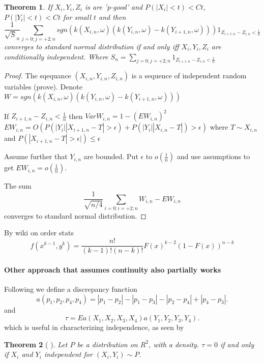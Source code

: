 \documentclass{article}
\newtheorem{Theorem}{Theorem}
\begin{document}
\begin{Theorem}
If $X_i,Y_i,Z_i$ is are 'p-good' and $P(|X_i| <t) <Ct$,  $P( |Y_i| <t) <Ct$ for small $t$ and then
\[
 \frac{1}{\sqrt S_n} \sum_{j=0;j=+2;n}  sgn(k(X_{i,n}, \omega) ( k(Y_{i,n}, \omega) - k(Y_{i+1,n}, \omega))) 1_{Z_{i+1,n} - Z_{i,n} < \frac 1 n }  
\]
converges to standard normal distribution  if and only iff  $X_i,Y_i,Z_i$ are conditionally independent. Where $S_n = \sum_{j=0;j=+2;n} 1_{Z_{i+1,n} - Z_{i,n} < \frac 1 n }$
\end{Theorem}
\begin{proof}
The sqequance $(X_{i,n},Y_{i,n},Z_{i,n})$ is a sequence of independent random variables (prove). Denote 
$W  = sgn(k(X_{i,n}, \omega) ( k(Y_{i,n}, \omega) - k(Y_{i+1,n}, \omega))) $


If $Z_{i+1,n} - Z_{i,n} < \frac 1 n$ then $Var W_{i,n}= 1- (E W_{i,n})^2 $
$E W_{i,n} = O(P(|Y_i||X_{i+1,n} -T| > \epsilon) + P(|Y_i||X_{i,n}-T|) > \epsilon)$ where $T \sim X_{i,n}$ and $P(|X_{i+1,n} -T| > \epsilon|) \leq \epsilon $ 

Assume further that $Y_{i,n}$ are bounded. Put $\epsilon$ to $o(\frac 1 n) $ and use assumptions to get $ E W_{i,n} = o(\frac 1 n)$.

The sum 
\[
 \frac{1}{\sqrt {n/4}} \sum_{i=0;i=+2;n}  W_{i,n} - E W_{i,n}  
\]
converges to standard  normal distribution. 
\end{proof}









By wiki  on order stats
\[
 f(x^{k-1},y^k) = \frac{n!}{(k-1)! (n-k)!}F(x)^{k-2}(1-F(x))^{n-k}
\]



\paragraph{Other approach that assumes continuity also partially works}

Following \cite{bergsma2014consistent} we define a discrepancy function
\begin{equation}
a(p_1,p_2,p_4,p_4) = |p_1-p_2| -|p_1-p_3|-|p_2-p_4|+|p_4-p_3|.
\end{equation}
and 
\begin{equation}
\tau = Ea(X_1,X_2,X_3,X_4)a(Y_1,Y_2,Y_3,Y_4).
\end{equation}
which is useful in characterizing independence, as seen by 
\begin{Theorem}[\cite{bergsma2014consistent} ]
\label{th:tau_star}
Let $P$ be a distribution on $R^2$, with a density.  $\tau = 0$ if and only if $X_i$ and $Y_i$ independent for  $(X_i,Y_i) \sim P$. 
\end{Theorem}
\end{document}
